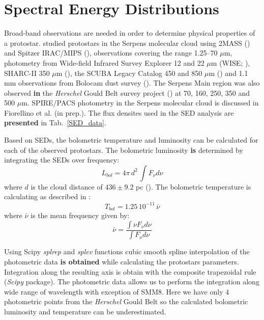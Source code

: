 \documentclass{aa}
\begin{document}
%
%
\begin{appendix} %
\label{app:seds}
\section{Spectral Energy Distributions}


Broad-band observations are needed in order to determine physical properties of a protostar. \cite{Dun15} studied protostars in the Serpens molecular cloud using 2MASS
(\citealt{Skr06}) and Spitzer IRAC/MIPS (\citealt{Eva09}), observations covering the range
1.25–70 $\mu$m, photometry from Wide-field Infrared Survey Explorer 12 and 22 $\mu$m (WISE;
\citealt{Wri10}), SHARC-II 350 $\mu$m (\citealt{Sur16}), the SCUBA Legacy Catalog 450 and 850 $\mu$m
(\citealt{dFr08}) and 1.1 mm observations from Bolocam dust survey (\citealt{Eno07}). The Serpens
Main region was also observed \textbf{in} the \textit{Herschel} Gould Belt survey project (\citealt{And10}) at 70, 160, 250, 350 and 500 $\mu$m.
SPIRE/PACS photometry in the Serpens molecular cloud is discussed in Fiorellino et al. (in prep.). The flux densites used in the SED analysis are \textbf{presented} in Tab.~\ref{SED_data}.

Based on SEDs, the bolometric temperature and luminosity can be calculated for each of the observed
protostars. The bolometric luminosity \textbf{is} determined by integrating the SEDs over frequency:
\begin{equation} \label{eq6} L_{bol} = 4 \pi \, d^2 \, \int F_\nu d\nu \end{equation} where $d$ is the
cloud distance of $436 \pm 9.2$ pc (\citealt{Ort17}). The bolometric temperature is calculating as
described in \cite{Mye93}: \begin{equation} \label{eq7} T_{bol} = 1.25 \, 10^{-11} \, \bar{\nu}
\end{equation} where $\bar{\nu}$ is the mean frequency given by: \begin{equation} \label{eq8}
\bar{\nu} = \frac{\int \nu F_\nu d\nu}{ \int F_\nu d\nu} \end{equation}

Using Scipy \textit{splrep} and \textit{splev} functions cubic smooth spline interpolation of the
photometric data \textbf{is obtained} while calculating the protostars parameters. Integration along the
resulting axis is obtain with the composite trapezoidal rule (\textit{Scipy} package). The
photometric data allows us to perform the integration along wide range of wavelength with exception
of SMM8. Here we have only 4 photometric points from the \textit{Herschel} Gould Belt so the calculated
bolometric luminosity and temperature can be underestimated.


\end{appendix}
\end{document}
